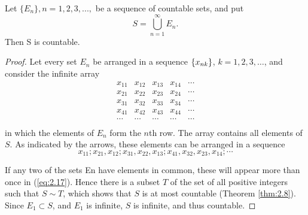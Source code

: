 

\begin{thm}
    \label{thm:2.12}
    Let $\{E_n\}, n=1,2,3,...,$ be a sequence of countable sets, and put
    \begin{equation}
        \label{eq:2.15}
        S = \bigcup_{n=1}^{\infty} E_n.
    \end{equation}
    Then S is countable.
\end{thm}

\begin{proof}
    Let every set $E_n$ be arranged in a sequence $\protect\{x_{nk}\}$,
    $k = 1,2,3,\dots$,
    and consider the infinite array
    \begin{equation}
        \label{eq:2.16}
        \begin{array}{ccccc}
            x_{11} & x_{12} & x_{13} & x_{14} & \cdots \\
            x_{21} & x_{22} & x_{23} & x_{24} & \cdots \\
            x_{31} & x_{32} & x_{33} & x_{34} & \cdots \\
            x_{41} & x_{42} & x_{43} & x_{44} & \cdots \\
            \cdots & \cdots & \cdots & \cdots & \cdots \\
        \end{array}
    \end{equation}
    in which the elements of $E_n$ form the $n$th row.
    The array contains all elements of $S$.
    As indicated by the arrows,
    these elements can be arranged in a sequence
    \begin{equation}
        \label{eq:2.17}
        x_{11};
        x_{21}, x_{12};
        x_{31}, x_{22}, x_{13};
        x_{41}, x_{32}, x_{23}, x_{14};
        \cdots
    \end{equation}

    If any two of the sets En have elements in common,
    these will appear more than once in (\ref{eq:2.17}).
    Hence there is a subset $T$ of the set of all positive integers
    such that $S \sim T$,
    which shows that $S$ is at most countable (Theorem \ref{thm:2.8}).
    Since $E_1 \subset S$, and $E_1$ is infinite,
    $S$ is infinite, and thus countable.
\end{proof}

